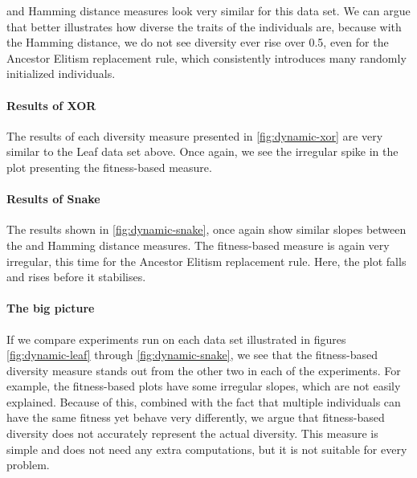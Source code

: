 \dia{} and Hamming distance measures look very similar for this data set. We can argue that \dia{} better illustrates how diverse the traits of the individuals are, because with the Hamming distance, we do not see diversity ever rise over \num{0.5}, even for the Ancestor Elitism replacement rule, which consistently introduces many randomly initialized individuals. 



\paragraph{Results of XOR} The results of each diversity measure presented in \cref{fig:dynamic-xor} are very similar to the Leaf data set above. Once again, we see the irregular spike in the plot presenting the fitness-based measure. %



\paragraph{Results of Snake} The results shown in \cref{fig:dynamic-snake}, once again show similar slopes between the \dia{} and Hamming distance measures. The fitness-based measure is again very irregular, this time for the Ancestor Elitism replacement rule. Here, the plot falls and rises before it stabilises.



\paragraph{The big picture} If we compare experiments run on each data set illustrated in figures \ref{fig:dynamic-leaf} through \ref{fig:dynamic-snake}, we see that the fitness-based diversity measure stands out from the other two in each of the experiments. For example, the fitness-based plots have some irregular slopes, which are not easily explained. Because of this, combined with the fact that multiple individuals can have the same fitness yet behave very differently, we argue that fitness-based diversity does not accurately represent the actual diversity. This measure is simple and does not need any extra computations, but it is not suitable for every problem. 

